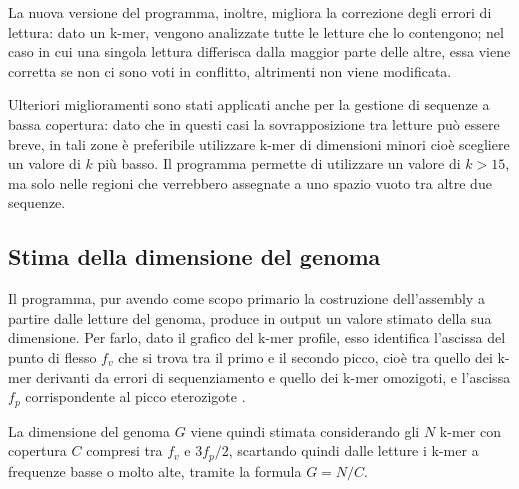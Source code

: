 \documentclass[crop=false, class=book]{standalone}
\begin{document}
	La nuova versione del programma, inoltre, migliora la correzione degli errori di lettura: dato un k-mer, vengono analizzate tutte le letture che lo contengono; nel caso in cui una singola lettura differisca dalla maggior parte delle altre, essa viene corretta se non ci sono voti in conflitto, altrimenti non viene modificata.
	
	Ulteriori miglioramenti sono stati applicati anche per la gestione di sequenze a bassa copertura: dato che in questi casi la sovrapposizione tra letture può essere breve, in tali zone è preferibile utilizzare k-mer di dimensioni minori cioè scegliere un valore di $k$ più basso. Il programma permette di utilizzare un valore di $k>15$, ma solo nelle regioni che verrebbero assegnate a uno spazio vuoto tra altre due sequenze. 
	
	\subsection{Stima della dimensione del genoma}
	Il programma, pur avendo come scopo primario la costruzione dell'assembly a partire dalle letture del genoma, produce in output un valore stimato della sua dimensione. Per farlo, dato il grafico del k-mer profile, esso identifica l'ascissa del punto di flesso $f_v$ che si trova tra il primo e il secondo picco, cioè tra quello dei k-mer derivanti da errori di sequenziamento e quello dei k-mer omozigoti, e l'ascissa $f_p$ corrispondente al picco eterozigote \cite{sun2017findGSE}.
	
	La dimensione del genoma $G$ viene quindi stimata considerando gli $N$ k-mer con copertura $C$ compresi tra $f_v$ e $3f_p/2$, scartando quindi dalle letture i k-mer a frequenze basse o molto alte, tramite la formula $G = N/C$.

	
	
	
	
	
	
	
	
\end{document}

